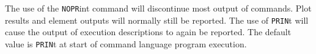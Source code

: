 \headb

The use of the {\tt NOPR}int command will discontinue
most output of commands.  Plot results and element
outputs will normally still be reported.  The use of {\tt PRIN}t
will cause the output of execution descriptions to
again be reported.  The default value is {\tt PRIN}t at start of
command language program execution.
\vfill\eject
